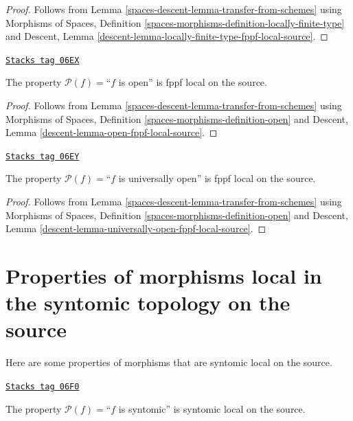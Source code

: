 \begin{proof}
Follows from
Lemma \ref{spaces-descent-lemma-transfer-from-schemes}
using
Morphisms of Spaces,
Definition \ref{spaces-morphisms-definition-locally-finite-type}
and
Descent, Lemma \ref{descent-lemma-locally-finite-type-fppf-local-source}.
\end{proof}

\begin{lemma}
\label{spaces-descent-lemma-open-fppf-local-source}
\href{https://stacks.math.columbia.edu/tag/06EX}{\texttt{Stacks tag 06EX}}

The property $\mathcal{P}(f)=$``$f$ is open''
is fppf local on the source.
\end{lemma}

\begin{proof}
Follows from
Lemma \ref{spaces-descent-lemma-transfer-from-schemes}
using
Morphisms of Spaces, Definition \ref{spaces-morphisms-definition-open}
and
Descent, Lemma \ref{descent-lemma-open-fppf-local-source}.
\end{proof}

\begin{lemma}
\label{spaces-descent-lemma-universally-open-fppf-local-source}
\href{https://stacks.math.columbia.edu/tag/06EY}{\texttt{Stacks tag 06EY}}

The property $\mathcal{P}(f)=$``$f$ is universally open''
is fppf local on the source.
\end{lemma}

\begin{proof}
Follows from
Lemma \ref{spaces-descent-lemma-transfer-from-schemes}
using
Morphisms of Spaces, Definition \ref{spaces-morphisms-definition-open}
and
Descent, Lemma \ref{descent-lemma-universally-open-fppf-local-source}.
\end{proof}

\section{Properties of morphisms local in the syntomic topology on the source}
\label{spaces-descent-section-syntomic-local-source}
Here are some properties of morphisms that are syntomic local on the source.

\begin{lemma}
\label{spaces-descent-lemma-syntomic-syntomic-local-source}
\href{https://stacks.math.columbia.edu/tag/06F0}{\texttt{Stacks tag 06F0}}

The property $\mathcal{P}(f)=$``$f$ is syntomic''
is syntomic local on the source.
\end{lemma}

